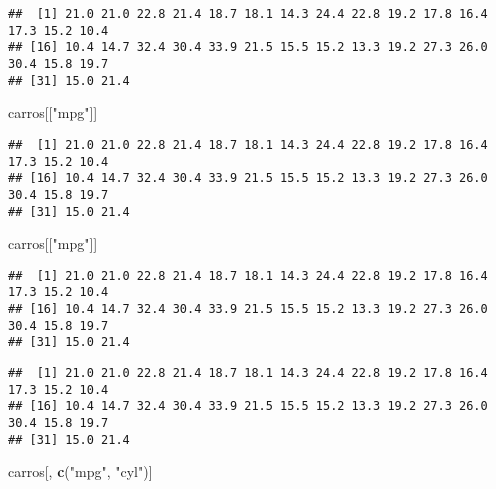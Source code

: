 \documentclass[]{book}
\newenvironment{Shaded}{\begin{snugshade}}{\end{snugshade}}
\newcommand{\KeywordTok}[1]{\textcolor[rgb]{0.13,0.29,0.53}{\textbf{#1}}}
\newcommand{\NormalTok}[1]{#1}
\newcommand{\OperatorTok}[1]{\textcolor[rgb]{0.81,0.36,0.00}{\textbf{#1}}}
\newcommand{\StringTok}[1]{\textcolor[rgb]{0.31,0.60,0.02}{#1}}
\begin{document}
\begin{verbatim}
##  [1] 21.0 21.0 22.8 21.4 18.7 18.1 14.3 24.4 22.8 19.2 17.8 16.4 17.3 15.2 10.4
## [16] 10.4 14.7 32.4 30.4 33.9 21.5 15.5 15.2 13.3 19.2 27.3 26.0 30.4 15.8 19.7
## [31] 15.0 21.4
\end{verbatim}

\begin{Shaded}
\begin{Highlighting}[]
\NormalTok{carros[[}\StringTok{"mpg"}\NormalTok{]]}
\end{Highlighting}
\end{Shaded}

\begin{verbatim}
##  [1] 21.0 21.0 22.8 21.4 18.7 18.1 14.3 24.4 22.8 19.2 17.8 16.4 17.3 15.2 10.4
## [16] 10.4 14.7 32.4 30.4 33.9 21.5 15.5 15.2 13.3 19.2 27.3 26.0 30.4 15.8 19.7
## [31] 15.0 21.4
\end{verbatim}

\begin{Shaded}
\begin{Highlighting}[]
\NormalTok{carros[[}\StringTok{"mpg"}\NormalTok{]]}
\end{Highlighting}
\end{Shaded}

\begin{verbatim}
##  [1] 21.0 21.0 22.8 21.4 18.7 18.1 14.3 24.4 22.8 19.2 17.8 16.4 17.3 15.2 10.4
## [16] 10.4 14.7 32.4 30.4 33.9 21.5 15.5 15.2 13.3 19.2 27.3 26.0 30.4 15.8 19.7
## [31] 15.0 21.4
\end{verbatim}

\begin{Shaded}
\end{Shaded}

\begin{verbatim}
##  [1] 21.0 21.0 22.8 21.4 18.7 18.1 14.3 24.4 22.8 19.2 17.8 16.4 17.3 15.2 10.4
## [16] 10.4 14.7 32.4 30.4 33.9 21.5 15.5 15.2 13.3 19.2 27.3 26.0 30.4 15.8 19.7
## [31] 15.0 21.4
\end{verbatim}

\begin{Shaded}
\begin{Highlighting}[]
\NormalTok{carros[, }\KeywordTok{c}\NormalTok{(}\StringTok{"mpg"}\NormalTok{, }\StringTok{"cyl"}\NormalTok{)]}
\end{Highlighting}
\end{Shaded}
\end{document}

